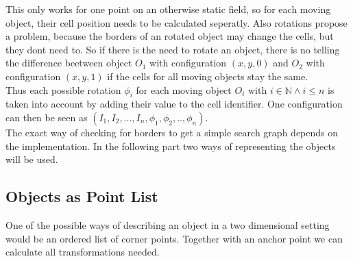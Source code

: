 This only works for one point on an otherwise static field, so for each moving object, their cell position needs to be calculated seperatly. Also rotations propose a problem, because the borders of an rotated object may change the cells, but they dont need to. So if there is the need to rotate an object, there is no telling the difference beetween object $O_1$ with configuration $(x,y,0)$ and $O_2$ with configuration $(x,y,1)$ if the cells for all moving objects stay the same.\\
Thus each possible rotation $\phi_i$ for each moving object $O_i$ with $i \in \mathbb{N} \wedge i \leq n$ is taken into account by adding their value to the cell identifier. One configuration can then be seen as $(I_1 , I_2,...,I_n,\phi_1,\phi_2,..,\phi_n)$.\\
The exact way of checking for borders to get a simple search graph depends on the implementation. In the following part two ways of representing the objects will be used.


\subsection{Objects as Point List}
\label{subsec::pointlist}
One of the possible ways of describing an object in a two dimensional setting would be an ordered list of corner points.  Together with an anchor point we can calculate all transformations needed.
